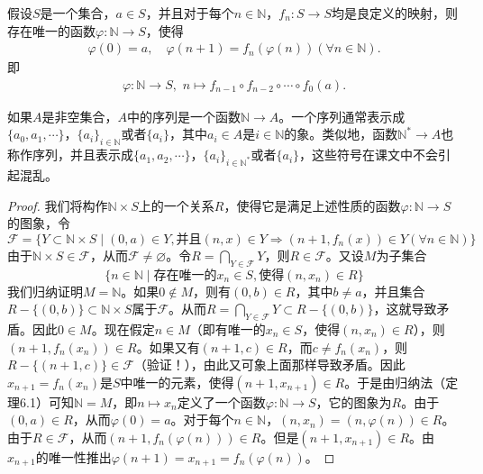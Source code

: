 \documentclass[../../main.tex]{subfiles}%
\begin{document}
\begin{theorem}[逆归定理]\label{theorem:逆归定理}
假设$S$是一个集合，$a \in S$，并且对于每个$n \in \mathbb{N}$，$f_n: S \to S$均是良定义的映射，则存在唯一的函数$\varphi: \mathbb{N} \to S$，使得
\begin{align*}
\varphi (0)=a,\quad \varphi (n+1)=f_n(\varphi (n))(\forall n\in \mathbb{N} ).
\end{align*}
即
\begin{align*}
\varphi:\mathbb{N}\to S,\,\,n\mapsto f_{n-1}\circ f_{n-2}\circ \cdots \circ f_0\left( a \right) .
\end{align*}
\end{theorem}
\begin{remark}
如果$A$是非空集合，$A$中的序列是一个函数$\mathbb{N} \to A$。一个序列通常表示成$\{a_0, a_1, \cdots\}$，$\{a_i\}_{i \in \mathbb{N}}$或者$\{a_i\}$，其中$a_i \in A$是$i \in \mathbb{N}$的象。类似地，函数$\mathbb{N}^* \to A$也称作序列，并且表示成$\{a_1, a_2, \cdots\}$，$\{a_i\}_{i \in \mathbb{N}^*}$或者$\{a_i\}$，这些符号在课文中不会引起混乱。
\end{remark}
\begin{proof}
我们将构作$\mathbb{N} \times S$上的一个关系$R$，使得它是满足上述性质的函数$\varphi: \mathbb{N} \to S$的图象，令
\[
\mathcal{F} = \{ Y \subset \mathbb{N} \times S \mid (0, a) \in Y, \text{并且} (n, x) \in Y \Rightarrow (n + 1, f_n(x)) \in Y (\forall n \in \mathbb{N}) \}
\]
由于$\mathbb{N} \times S \in \mathcal{F}$，从而$\mathcal{F} \neq \varnothing$。令$R = \bigcap_{Y \in \mathcal{F}} Y$，则$R \in \mathcal{F}$。又设$M$为子集合
\[
\{ n \in \mathbb{N} \mid \text{存在唯一的} x_n \in S, \text{使得} (n, x_n) \in R \}
\]
我们归纳证明$M = \mathbb{N}$。如果$0 \notin M$，则有$(0, b) \in R$，其中$b \neq a$，并且集合$R - \{ (0, b) \} \subset \mathbb{N} \times S$属于$\mathcal{F}$。从而$R = \bigcap_{Y \in \mathcal{F}} Y \subset R - \{ (0, b) \}$，这就导致矛盾。因此$0 \in M$。现在假定$n \in M$（即有唯一的$x_n \in S$，使得$(n, x_n) \in R$），则$(n + 1, f_n(x_n)) \in R$。如果又有$(n + 1, c) \in R$，而$c \neq f_n(x_n)$，则$R - \{ (n + 1, c) \} \in \mathcal{F}$（验证！），由此又可象上面那样导致矛盾。因此$x_{n + 1} = f_n(x_n)$是$S$中唯一的元素，使得$(n + 1, x_{n + 1}) \in R$。于是由归纳法（定理6.1）可知$\mathbb{N} = M$，即$n \longmapsto x_n$定义了一个函数$\varphi: \mathbb{N} \to S$，它的图象为$R$。由于$(0, a) \in R$，从而$\varphi(0) = a$。对于每个$n \in \mathbb{N}$，$(n, x_n) = (n, \varphi(n)) \in R$。由于$R \in \mathcal{F}$，从而$(n + 1, f_n(\varphi(n))) \in R$。但是$(n + 1, x_{n + 1}) \in R$。由$x_{n + 1}$的唯一性推出$\varphi(n + 1) = x_{n + 1} = f_n(\varphi(n))$。
\end{proof}
\end{document}
